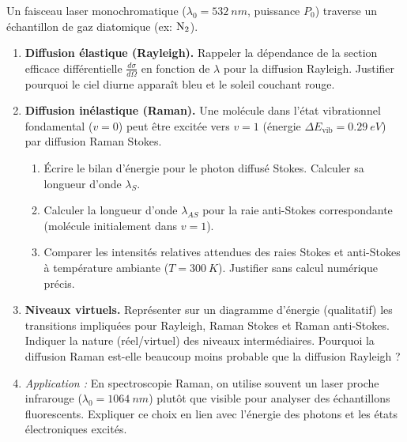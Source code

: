 \documentclass[11pt]{article}
\begin{document}
\begin{exercice}
Un faisceau laser monochromatique ($\lambda_0 = \SI{532}{nm}$, puissance $P_0$) traverse un échantillon de gaz diatomique (ex: $\ce{N2}$).
\begin{enumerate}
    \item \textbf{Diffusion élastique (Rayleigh).} Rappeler la dépendance de la section efficace différentielle $\frac{d\sigma}{d\Omega}$ en fonction de $\lambda$ pour la diffusion Rayleigh. Justifier pourquoi le ciel diurne apparaît bleu et le soleil couchant rouge.
    \item \textbf{Diffusion inélastique (Raman).} Une molécule dans l'état vibrationnel fondamental ($v=0$) peut être excitée vers $v=1$ (énergie $\Delta E_{\text{vib}} = \SI{0,29}{eV}$) par diffusion Raman Stokes.
    \begin{enumerate}
        \item Écrire le bilan d'énergie pour le photon diffusé Stokes. Calculer sa longueur d'onde $\lambda_S$.
        \item Calculer la longueur d'onde $\lambda_{AS}$ pour la raie anti-Stokes correspondante (molécule initialement dans $v=1$).
        \item Comparer les intensités relatives attendues des raies Stokes et anti-Stokes à température ambiante ($T = \SI{300}{K}$). Justifier sans calcul numérique précis.
    \end{enumerate}
    \item \textbf{Niveaux virtuels.} Représenter sur un diagramme d'énergie (qualitatif) les transitions impliquées pour Rayleigh, Raman Stokes et Raman anti-Stokes. Indiquer la nature (réel/virtuel) des niveaux intermédiaires. Pourquoi la diffusion Raman est-elle beaucoup moins probable que la diffusion Rayleigh ?
    \item \textit{Application :} En spectroscopie Raman, on utilise souvent un laser proche infrarouge ($\lambda_0 = \SI{1064}{nm}$) plutôt que visible pour analyser des échantillons fluorescents. Expliquer ce choix en lien avec l'énergie des photons et les états électroniques excités.
\end{enumerate}
\end{exercice}
\end{document}
